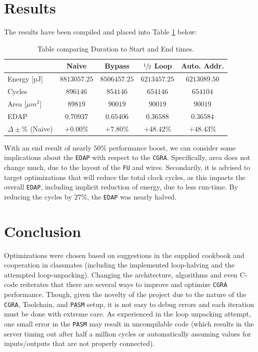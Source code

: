 \documentclass[letterpaper, 10 pt, conference]{ieeeconf}  %
\begin{document}
\pagebreak

\section{Results}

The results have been compiled and placed into Table \ref{tab:compare} below:

\begin{table}[h!]
\centering
\caption{Table comparing Duration to Start and End times.}
\label{tab:compare}
\vspace{5pt}
\centering
\begin{tabular}{|l|c|c|c|c|}
\rowcolor[HTML]{C0C0C0}
\hline
 & Naive & Bypass & $\sfrac{1}{2}$ Loop & Auto. Addr. \\ \hline
Energy [pJ] & $8813057.25$  & $8506457.25$ & $6213457.25$ & $6213089.50$ \\ \hline
Cycles & $896146$ & $854146$ & $654146$ & $654104$ \\ \hline
Area [$\mu m^2$] & $89819$ & $90019$ & $90019$ & $90019$ \\ \hline
EDAP & $0.70937$ & $0.65406$ & $0.36588$ & $0.36584$ \\ \hline
$\Delta\pm\%$ (Naive) & $+0.00\%$ & $+7.80\%$ & $+48.42\%$ & $+48.43\%$ \\ \hline

\end{tabular}
\end{table}

With an end result of nearly $50\%$ performance boost, we can consider some implications about the \texttt{EDAP} with respect to the \texttt{CGRA}. Specifically, area does not change much, due to the layout of the \texttt{FU} and wires. Secondarily, it is advised to target optimizations that will reduce the total clock cycles, as this impacts the overall \texttt{EDAP}, including implicit reduction of energy, due to less run-time. By reducing the cycles by $27\%$, the \texttt{EDAP} was nearly halved.

\section{Conclusion}

Optimizations were chosen based on suggestions in the supplied cookbook and cooperation in classmates (including the implemented loop-halving and the attempted loop-unpacking). Changing the architecture, algorithms and even C-code reiterates that there are several ways to improve and optimize \texttt{CGRA} performance. Though, given the novelty of the project due to the nature of the \texttt{CGRA}, Toolchain, and \texttt{PASM} setup, it is not easy to debug errors and each iteration must be done with extreme care. As experienced in the loop unpacking attempt, one small error in the \texttt{PASM} may result in uncompilable code (which results in the server timing out after half a million cycles or automatically assuming values for inputs/outputs that are not properly connected).
\end{document}
